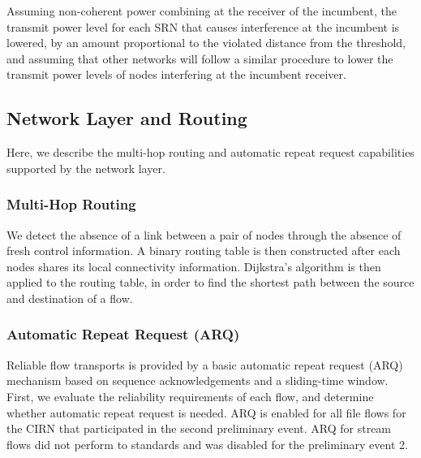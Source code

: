 \documentclass[11pt]{article}
\begin{document}
Assuming non-coherent power combining at the receiver of the incumbent, the transmit power level for each SRN that causes interference at the incumbent is lowered, by an amount proportional to the violated distance from the threshold, and assuming that other networks will follow a similar procedure to lower the transmit power levels of nodes interfering at the incumbent receiver.
\subsection{Network Layer and Routing}
Here, we describe the multi-hop routing and automatic repeat request capabilities supported by the network layer.
\subsubsection{Multi-Hop Routing}
We detect the absence of a link between a pair of nodes through the absence of fresh control information. A binary routing table is then constructed after each nodes shares its local connectivity information. Dijkstra's algorithm is then applied to the routing table, in order to find the shortest path between the source and destination of a flow.
\subsubsection{Automatic Repeat Request (ARQ)}
Reliable flow transports is provided by a basic automatic repeat request (ARQ) mechanism based on sequence acknowledgements and a sliding-time window. First, we evaluate the reliability requirements of each flow, and determine whether automatic repeat request is needed. ARQ is enabled for all file flows for the CIRN that participated in the second preliminary event. ARQ for stream flows did not perform to standards and was disabled for the preliminary event 2.
\end{document}
